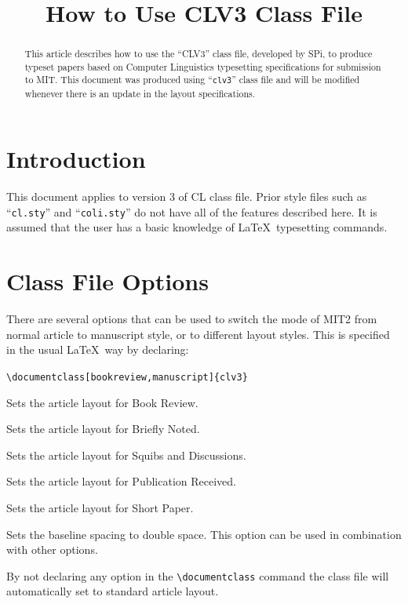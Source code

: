 \title{How to Use CLV3 Class File}

\begin{abstract}
This article describes how to use the ``CLV3'' class file, developed by {\sf SPi}, to produce typeset papers based on Computer Linguistics typesetting specifications for submission to MIT. This document was produced using ``{\tt clv3}'' class file and will be modified whenever there is an update in the layout specifications.
\end{abstract}

\section{Introduction}

This document applies to version 3 of CL class file. Prior style files such as 
``{\tt cl.sty}'' and ``{\tt coli.sty}'' do not have all of the features described here. It is assumed that the user has a basic knowledge of \LaTeX\ typesetting commands.

\section{Class File Options}

There are several options that can be used to switch the mode of MIT2 from normal article to manuscript style, or to different layout styles. This is specified in the usual \LaTeX\ way by declaring:

\verb|\documentclass[bookreview,manuscript]{clv3}|

\begin{deflist}
\item[bookreview] Sets the article layout for Book Review.
\item[brief] Sets the article layout for Briefly Noted.
\item[discussion] Sets the article layout for Squibs and Discussions.
\item[pubrec] Sets the article layout for Publication Received.
\item[shortpaper] Sets the article layout for Short Paper.
\item[manuscript] Sets the baseline spacing to double space. This option can be used in combination with other options.
\end{deflist}

By not declaring any option in the \verb|\documentclass| command the class file will automatically set to standard article layout.

